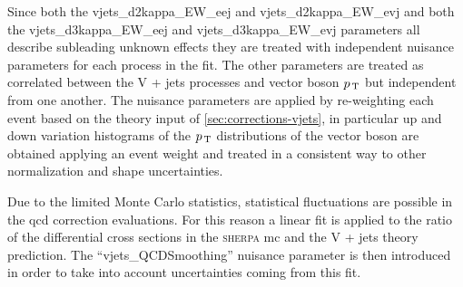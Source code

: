 Since both the vjets\_d2kappa\_EW\_eej and vjets\_d2kappa\_EW\_evj and both the
vjets\_d3kappa\_EW\_eej and vjets\_d3kappa\_EW\_evj parameters all describe
subleading unknown effects they are treated with independent nuisance parameters
for each process in the fit. The other parameters are treated as correlated
between the V + jets processes and vector boson $p_\mathrm{\, T}$ but independent from one
another. The nuisance parameters are applied by re-weighting each event based on
the theory input of \cref{sec:corrections-vjets}, in particular up and down
variation histograms of the $p_\mathrm{\, T}$ distributions of the vector boson are obtained
applying an event weight and treated in a consistent way to other normalization
and shape uncertainties.

Due to the limited Monte Carlo statistics, statistical fluctuations are possible
in the \gls{qcd} correction evaluations. For this reason a linear fit is applied
to the ratio of the differential cross sections in the \textsc{sherpa} \gls{mc}
and the V + jets theory prediction. The ``vjets\_QCDSmoothing'' nuisance
parameter is then introduced in order to take into account uncertainties coming
from this fit.

